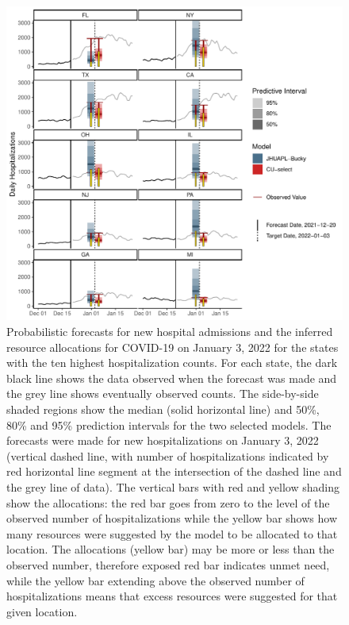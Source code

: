 \documentclass{article}\usepackage[]{graphicx}\usepackage[]{xcolor}
\makeatletter
\def\maxwidth{ %
  \ifdim\Gin@nat@width>\linewidth
    \linewidth
  \else
    \Gin@nat@width
  \fi
}
\newenvironment{knitrout}{}{} %
\makeatother
\begin{document}
\begin{knitrout}
\color{fgcolor}\begin{figure}
\includegraphics[width=\maxwidth]{figure/thermometer-plot-1} \caption[Probabilistic forecasts for new hospital admissions and the inferred resource allocations for COVID-19 on January 3, 2022 for the states with the ten highest hospitalization counts]{Probabilistic forecasts for new hospital admissions and the inferred resource allocations for COVID-19 on January 3, 2022 for the states with the ten highest hospitalization counts. For each state, the dark black line shows the data observed when the forecast was made and the grey line shows eventually observed counts. The side-by-side shaded regions show the median (solid horizontal line) and 50\%, 80\% and 95\% prediction intervals for the two selected models. The forecasts were made for new hospitalizations on January 3, 2022 (vertical dashed line, with number of hospitalizations indicated by red horizontal line segment at the intersection of the dashed line and the grey line of data). The vertical bars with red and yellow shading show the allocations: the red bar goes from zero to the level of the observed number of hospitalizations while the yellow bar shows how many resources were suggested by the model to be allocated to that location. The allocations (yellow bar) may be more or less than the observed number, therefore exposed red bar indicates unmet need, while the yellow bar extending above the observed number of hospitalizations means that excess resources were suggested for that given location.}\label{fig:thermometer-plot}
\end{figure}

\end{knitrout}
\end{document}
